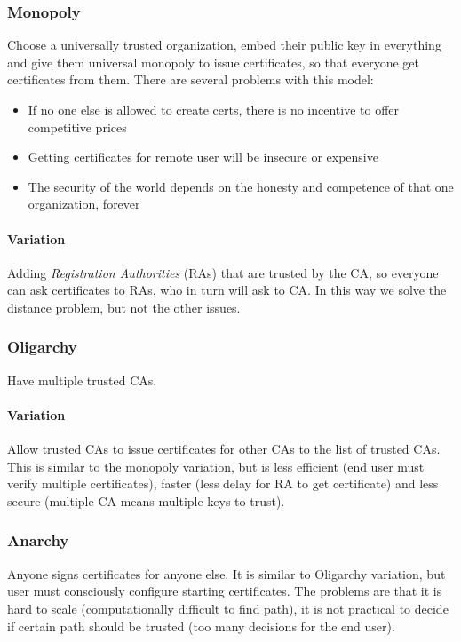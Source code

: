 \subsubsection{Monopoly}
Choose a universally trusted organization, embed their public key in everything and give them universal monopoly to issue certificates, so that everyone get certificates from them. There are several problems with this model:
\begin{itemize}
    \item If no one else is allowed to create certs, there is no incentive to offer competitive prices
    \item Getting certificates for remote user will be insecure or expensive
    \item The security of the world depends on the honesty and competence of that one organization, forever
\end{itemize}
\paragraph{Variation} Adding \textit{Registration Authorities} (RAs) that are trusted by the CA, so everyone can ask certificates to RAs, who in turn will ask to CA. In this way we solve the distance problem, but not the other issues.
\subsubsection{Oligarchy}
Have multiple trusted CAs. 
\paragraph{Variation} Allow trusted CAs to issue certificates for other CAs to the list of trusted CAs. This is similar to the monopoly variation, but is less efficient (end user must verify multiple certificates), faster (less delay for RA to get certificate) and less secure (multiple CA means multiple keys to trust).

\subsubsection{Anarchy}
Anyone signs certificates for anyone else. It is similar to Oligarchy variation, but user must consciously configure starting certificates. The problems are that it is hard to scale (computationally difficult to find path), it is not practical to decide if certain path should be trusted (too many decisions for the end user).

